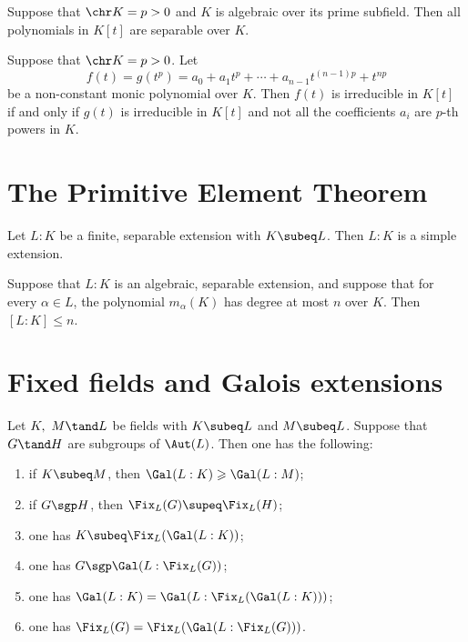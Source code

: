 \documentclass{article}
\begin{document}
  \begin{tcorollary}
    Suppose that \( \chr K = p > 0 \) and \( K \) is algebraic over its prime subfield. Then all polynomials in \( K[t] \) are separable over \( K \).
  \end{tcorollary}

  \begin{ttheorem}
    Suppose that \( \chr K = p > 0 \). Let
    \[
      f(t)=g(t^p)=a_0+a_1t^p+\cdots+a_{n-1}t^{(n-1)p}+t^{np}
    \]
    be a non-constant monic polynomial over \( K \). Then \( f(t) \) is irreducible in \( K[t] \) if and only if \( g(t) \) is irreducible in \( K[t] \) and not all the coefficients \( a_i \) are \( p \)-th powers in \( K \).
  \end{ttheorem}

\section{The Primitive Element Theorem}
  \begin{ttheorem}
    Let \( L:K \) be a finite, separable extension with \( K\subeq L \). Then \( L:K \) is a simple extension.
  \end{ttheorem}

  \begin{tcorollary}
    Suppose that \( L:K \) is an algebraic, separable extension, and suppose that for every \( \alpha\in L \), the polynomial \( m_\alpha(K) \) has degree at most \( n \) over \( K \). Then \( [L:K]\leq n \).
  \end{tcorollary}

\section{Fixed fields and Galois extensions}
  \begin{tproposition}
    Let \( K,\ M \tand L \) be fields with \( K\subeq L \) and \( M\subeq L \). Suppose that \( G\tand H \) are subgroups of \( \Aut(L) \). Then one has the following:
    \begin{enumerate}[label=(\alph*)]
      \item if \( K\subeq M \), then \( \Gal(L:K) \geqslant \Gal(L:M) \);
      \item if \( G\sgp H \), then \( \Fix_L(G)\supeq \Fix_L(H) \);
      \item one has \( K\subeq \Fix_L(\Gal(L:K)) \);
      \item one has \( G\sgp\Gal(L:\Fix_L(G)) \);
      \item one has \( \Gal(L:K) = \Gal(L:\Fix_L(\Gal(L:K))) \);
      \item one has \( \Fix_L(G) = \Fix_L(\Gal(L:\Fix_L(G))) \).
    \end{enumerate}
  \end{tproposition}
\end{document}
